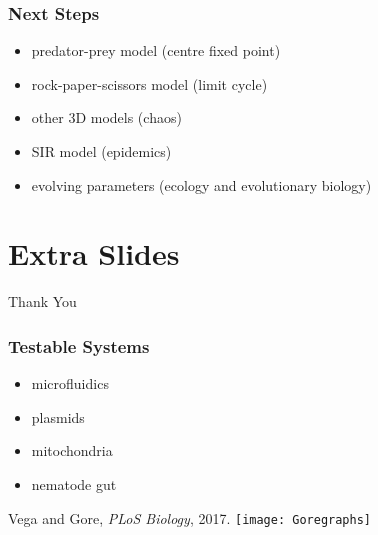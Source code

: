 \documentclass{beamer}
\begin{document}
\iffalse
\begin{frame}
\frametitle{Conclusions}
\begin{itemize}
	\item Competitive Exclusion
	\begin{itemize}
		\item ecological niche
	\end{itemize}
	\pause
	\item Biodiversity
	\begin{itemize}
		\item as measured by abundance curve or number of species
	\end{itemize}
	\pause
	\item Niche models vs Neutral models
\end{itemize}
\end{frame}
\fi

\begin{frame}
\frametitle{Next Steps}
\begin{itemize}
	\item predator-prey model (centre fixed point)
	\pause
	\item rock-paper-scissors model (limit cycle)
	\pause
	\item other 3D models (chaos)
	\pause
	\item SIR model (epidemics)
	\pause
	\item evolving parameters (ecology and evolutionary biology)
\end{itemize}
\end{frame}



\section*[Extras]{Extra Slides}

\begin{frame}
\centering
{{\Huge Thank You}}
\end{frame}


\begin{frame}
\frametitle{Testable Systems}
\begin{itemize}
\item microfluidics
\pause
\item plasmids
\pause
\item mitochondria
\pause
\item nematode gut
\end{itemize}
\pause
\centering
Vega and Gore, \emph{PLoS Biology}, 2017.
\texttt{[image: Goregraphs]}
\end{frame}
\end{document}
